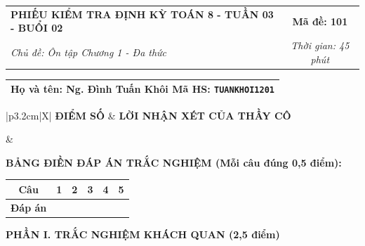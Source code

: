 \documentclass[12pt,a4paper]{article}
\begin{document}
\newpage



\noindent
\begin{tabularx}{\linewidth}{|X|c|}
\hline
\textbf{PHIẾU KIỂM TRA ĐỊNH KỲ TOÁN 8 - TUẦN 03 - BUỔI 02} & \textbf{Mã đề: 101} \\
\textit{Chủ đề: Ôn tập Chương 1 - Đa thức} & \textit{Thời gian: 45 phút} \\
\hline
\end{tabularx}

\vspace{1mm}

\noindent
\begin{tabularx}{\linewidth}{|X|}
\hline
\rule[-2mm]{0pt}{7.5mm}\textbf{Họ và tên:} \textbf{\large Ng. Đình Tuấn Khôi} \hfill \textbf{Mã HS:} \texttt{TUANKHOI1201} \quad \\
\hline
\end{tabularx}

\vspace{1mm}

\noindent
\begin{tabularx}{\linewidth}{|p{3.2cm}|X|}
\hline
\centering\textbf{ĐIỂM SỐ} & \centering\textbf{LỜI NHẬN XÉT CỦA THẦY CÔ} \tabularnewline
\hline
\rule{0pt}{1.3cm} & \tabularnewline
\hline
\end{tabularx}

\vspace{1.2mm}

\noindent\textbf{BẢNG ĐIỀN ĐÁP ÁN TRẮC NGHIỆM (Mỗi câu đúng 0,5 điểm):}
\vspace{0.8mm}

\noindent
\renewcommand{\arraystretch}{1.35}
\begin{tabularx}{\linewidth}{|c|*{5}{>{\centering\arraybackslash}X|}}
\hline
\textbf{Câu} & \textbf{1} & \textbf{2} & \textbf{3} & \textbf{4} & \textbf{5} \\
\hline
\textbf{Đáp án} & & & & & \\
\hline
\end{tabularx}
\renewcommand{\arraystretch}{1.0}

\vspace{1.5mm}

\noindent\textbf{\large PHẦN I. TRẮC NGHIỆM KHÁCH QUAN (2,5 điểm)}
\vspace{1mm}
\end{document}
